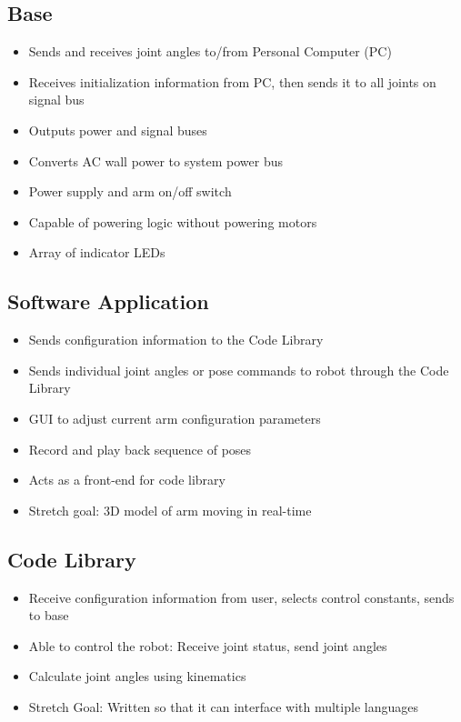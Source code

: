 \subsection{Base}
\begin{itemize}
\item Sends and receives joint angles to/from Personal Computer (PC)
\item Receives initialization information from PC, then sends it to all joints on signal bus
\item Outputs power and signal buses
\item Converts AC wall power to system power bus
\item Power supply and arm on/off switch
\item Capable of powering logic without powering motors
\item Array of indicator LEDs
\end{itemize}

\subsection{Software Application}
\begin{itemize}
\item Sends configuration information to the Code Library
\item Sends individual joint angles or pose commands to robot through the Code Library
\item GUI to adjust current arm configuration parameters
\item Record and play back sequence of poses
\item Acts as a front-end for code library
\item Stretch goal: 3D model of arm moving in real-time
\end{itemize}

\subsection{Code Library}
\begin{itemize}
\item Receive configuration information from user, selects control constants, sends to base
\item Able to control the robot: Receive joint status, send joint angles
\item Calculate joint angles using kinematics
\item Stretch Goal: Written so that it can interface with multiple languages
\end{itemize}




